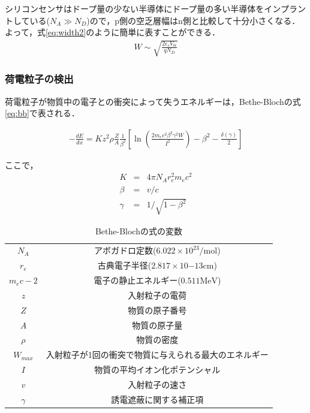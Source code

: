 シリコンセンサはドープ量の少ない半導体にドープ量の多い半導体をインプラントしている($N_A \gg N_D$)ので，p側の空乏層幅はn側と比較して十分小さくなる．よって，式\ref{eq:width2}のように簡単に表すことができる．
\begin{eqnarray}
  \label{eq:width2}
  W \sim \sqrt{ \frac{2\epsilon_s V_{bi}}{q N_D} }
\end{eqnarray}

\subsubsection*{荷電粒子の検出}
荷電粒子が物質中の電子との衝突によって失うエネルギーは，Bethe-Blochの式\ref{eq:bb}で表される．\par
\begin{eqnarray}
  \label{eq:bb}
  - \frac{dE}{dx} = K z^2 \rho \frac{Z}{A} \frac{1}{\beta^2} \left[ \ln \left( \frac{2m_e c^2 \beta^2 \gamma^2 W}{I^2} \right) - \beta^2 - \frac{\delta(\gamma)}{2} \right]
\end{eqnarray}

ここで，
\begin{eqnarray}
  K &=& 4\pi N_A r^2_e m_e c^2 \nonumber \\
  \beta &=& v/c \nonumber \\
  \gamma &=& 1/\sqrt{1-\beta^2} \nonumber
\end{eqnarray}


\begin{table}[h]
  \centering
  \caption{Bethe-Blochの式の変数}
  \label{tab:bethe}
  \begin{tabular}{cc} \hline
    $N_A$ & アボガドロ定数($6.022 \times 10^{23} \mathrm{/mol}$)\\
    $r_e$ & 古典電子半径($2.817 \times 10{-13} \mathrm{cm}$)\\
    $m_e c-2$ & 電子の静止エネルギー($0.511 \mathrm{MeV}$)\\
    $z$ & 入射粒子の電荷\\
    $Z$ & 物質の原子番号\\
    $A$ & 物質の原子量\\
    $\rho$ & 物質の密度\\
    $W_{max}$ & 入射粒子が1回の衝突で物質に与えられる最大のエネルギー\\
    $I$ & 物質の平均イオン化ポテンシャル\\
    $v$ & 入射粒子の速さ\\
    $\gamma$ & 誘電遮蔽に関する補正項\\ \hline
  \end{tabular}
\end{table}


